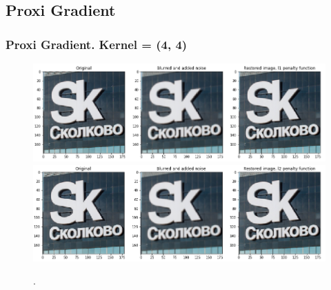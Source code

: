 \documentclass[hyperref={pdfpagelabels=false}]{beamer}
\begin{document}
\subsection{Proxi Gradient}
\begin{frame}
\frametitle{Proxi Gradient. Kernel = (4, 4)}
\begin{center}
\begin{figure}[h]
\begin{adjustwidth}{-0.2cm}{-0.5 cm}
\includegraphics[scale=0.355]{l1_all_imgs_4_4.png} \\
\includegraphics[scale=0.355]{l2_all_imgs_4_4.png} \\
\end{adjustwidth}
\caption{.}
\end{figure}
\end{center}

\end{frame}
\end{document}
